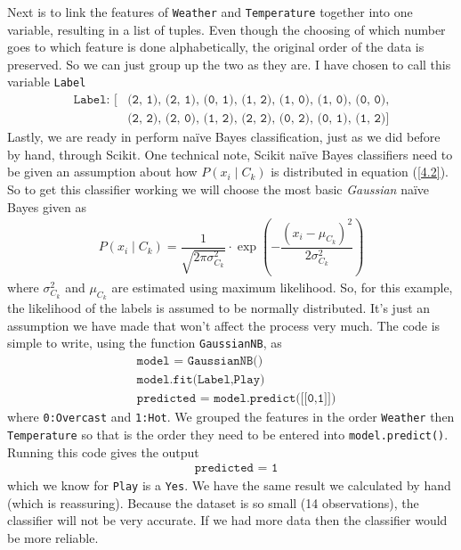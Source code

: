 \documentclass[12pt,twoside]{report}   %
\newcommand{\bkt}[1]{\left( #1 \right)}
\newcommand{\ti}{\textit}
\begin{document}
Next is to link the features of \colorbox{codegrey}{\texttt{Weather}} and \colorbox{codegrey}{\texttt{Temperature}} together into one variable, resulting in a list of tuples. Even though the choosing of which number goes to which feature is done alphabetically, the original order of the data is preserved. So we can just group up the two as they are. I have chosen to call this variable \colorbox{codegrey}{\texttt{Label}}
\begin{align*}
\texttt{Label: [}&\texttt{(2, 1), (2, 1), (0, 1), (1, 2), (1, 0), (1, 0), (0, 0),}\\
&\texttt{(2, 2), (2, 0), (1, 2), (2, 2), (0, 2), (0, 1), (1, 2)]}
\end{align*}
Lastly, we are ready in perform na\"{i}ve Bayes classification, just as we did before by hand, through Scikit. One technical note, Scikit na\"{i}ve Bayes classifiers need to be given an assumption about how $P(x_i\mid C_k)$ is distributed in equation (\ref{4.2}). So to get this classifier working we will choose the most basic \ti{Gaussian} na\"{i}ve Bayes given as
\begin{align*}
P(x_i\mid C_k) = \dfrac{1}{\sqrt{2\pi\sigma^2_{C_k}}}\cdot\exp\bkt{-\dfrac{(x_i - \mu_{C_k})^2}{2\sigma^2_{C_k}}}
\end{align*}
where $\sigma^2_{C_k}$ and $\mu_{C_k}$ are estimated using maximum likelihood. So, for this example, the likelihood of the labels is assumed to be normally distributed. It's just an assumption we have made that won't affect the process very much. The code is simple to write, using the function \colorbox{codegrey}{\texttt{GaussianNB}}, as
\begin{align*}
&\texttt{model = GaussianNB()}\\
&\texttt{model.fit(Label,Play)}\\
&\texttt{predicted = model.predict([[0,1]])}
\end{align*}
where \colorbox{codegrey}{\texttt{0:Overcast}} and \colorbox{codegrey}{\texttt{1:Hot}}. We grouped the features in the order \colorbox{codegrey}{\texttt{Weather}} then \colorbox{codegrey}{\texttt{Temperature}} so that is the order they need to be entered into \colorbox{codegrey}{\texttt{model.predict()}}. Running this code gives the output
\begin{align*}
&\texttt{predicted = 1}
\end{align*}
which we know for \colorbox{codegrey}{\texttt{Play}} is a \colorbox{codegrey}{\texttt{Yes}}. We have the same result we calculated by hand (which is reassuring). Because the dataset is so small (14 observations), the classifier will not be very accurate. If we had more data then the classifier would be more reliable.
\end{document}

